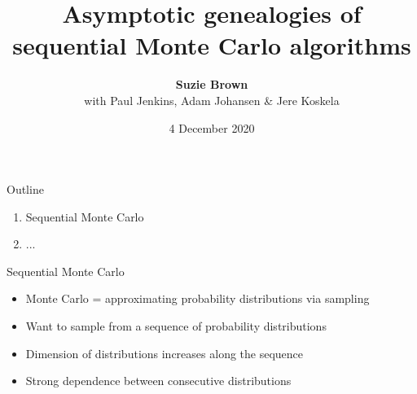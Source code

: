 \documentclass[aspectratio=169]{beamer}
\title[Genealogies of SMC Algorithms]{Asymptotic genealogies of sequential Monte Carlo algorithms}
\author[Suzie Brown]{\textbf{Suzie Brown} \\ with Paul Jenkins, Adam Johansen \& Jere Koskela}
\date{4 December 2020}
\theoremstyle{definition}
\begin{document}
\begin{frame}
\maketitle
\end{frame}

\begin{frame}{Outline}
\begin{enumerate}
\item Sequential Monte Carlo
\item ...
\end{enumerate}
\end{frame}




\begin{frame}{Sequential Monte Carlo}
\begin{itemize}
\item Monte Carlo = approximating probability distributions via sampling %
\item Want to sample from a sequence of probability distributions %
\item Dimension of distributions increases along the sequence
\item Strong dependence between consecutive distributions
\end{itemize}


\end{frame}
\end{document}
